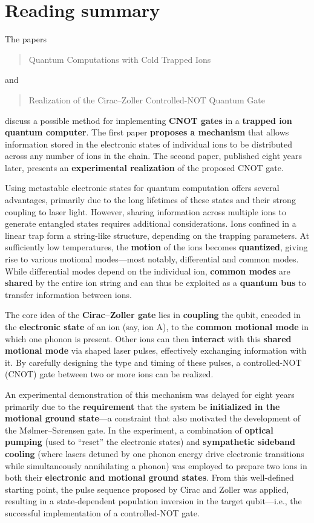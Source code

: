 \documentclass{alex_summary}
\begin{document}
\section*{Reading summary}

The papers \blockcquote{cirac_quantum_1995}{Quantum Computations with Cold Trapped Ions} and \blockcquote{schmidt-kaler_realization_2003}{Realization of the Cirac–Zoller Controlled-NOT Quantum Gate} discuss a possible method for implementing \textbf{CNOT gates} in a \textbf{trapped ion quantum computer}. The first paper \textbf{proposes a mechanism} that allows information stored in the electronic states of individual ions to be distributed across any number of ions in the chain. The second paper, published eight years later, presents an \textbf{experimental realization} of the proposed CNOT gate.

Using metastable electronic states for quantum computation offers several advantages, primarily due to the long lifetimes of these states and their strong coupling to laser light. However, sharing information across multiple ions to generate entangled states requires additional considerations. Ions confined in a linear trap form a string-like structure, depending on the trapping parameters. At sufficiently low temperatures, the \textbf{motion} of the ions becomes \textbf{quantized}, giving rise to various motional modes—most notably, differential and common modes. While differential modes depend on the individual ion, \textbf{common modes} are \textbf{shared} by the entire ion string and can thus be exploited as a \textbf{quantum bus} to transfer information between ions.

The core idea of the \textbf{Cirac–Zoller gate} lies in \textbf{coupling} the qubit, encoded in the \textbf{electronic state} of an ion (say, ion A), to the \textbf{common motional mode} in which one phonon is present. Other ions can then \textbf{interact} with this \textbf{shared motional mode} via shaped laser pulses, effectively exchanging information with it. By carefully designing the type and timing of these pulses, a controlled-NOT (CNOT) gate between two or more ions can be realized.

An experimental demonstration of this mechanism was delayed for eight years primarily due to the \textbf{requirement} that the system be \textbf{initialized in the motional ground state}—a constraint that also motivated the development of the Mølmer–Sørensen gate. In the experiment, a combination of \textbf{optical pumping} (used to \enquote{reset} the electronic states) and \textbf{sympathetic sideband cooling} (where lasers detuned by one phonon energy drive electronic transitions while simultaneously annihilating a phonon) was employed to prepare two  ions in both their \textbf{electronic and motional ground states}. From this well-defined starting point, the pulse sequence proposed by Cirac and Zoller was applied, resulting in a state-dependent population inversion in the target qubit—i.e., the successful implementation of a controlled-NOT gate.
\end{document}
